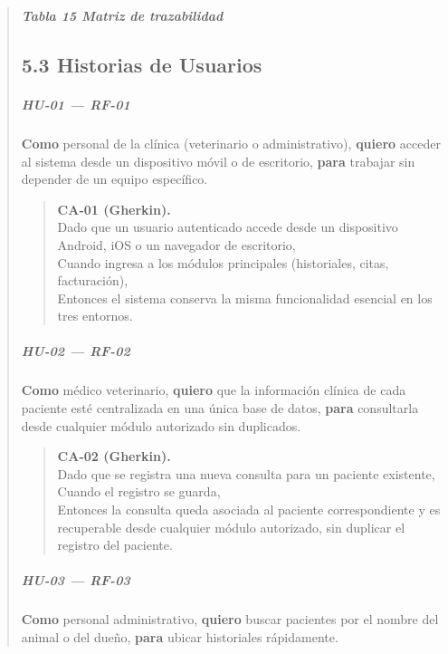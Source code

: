 \documentclass[
]{article}
\begin{document}
\begin{quote}
\protect{}\label{_bookmark66}{}\emph{\textbf{Tabla 15
Matriz de trazabilidad}}

\subsection{5.3 Historias de Usuarios} \label{historias-de-usuario}
\subparagraph{HU-01 --- RF-01}
\textbf{Como} personal de la clínica (veterinario o administrativo),
\textbf{quiero} acceder al sistema desde un dispositivo móvil o de escritorio,
\textbf{para} trabajar sin depender de un equipo específico.

\begin{quote}
\textbf{CA-01 (Gherkin).} \\
Dado que un usuario autenticado accede desde un dispositivo Android, iOS o un navegador de escritorio, \\
Cuando ingresa a los módulos principales (historiales, citas, facturación), \\
Entonces el sistema conserva la misma funcionalidad esencial en los tres entornos.
\end{quote}

\subparagraph{HU-02 --- RF-02}
\textbf{Como} médico veterinario,
\textbf{quiero} que la información clínica de cada paciente esté centralizada en una única base de datos,
\textbf{para} consultarla desde cualquier módulo autorizado sin duplicados.

\begin{quote}
\textbf{CA-02 (Gherkin).} \\
Dado que se registra una nueva consulta para un paciente existente, \\
Cuando el registro se guarda, \\
Entonces la consulta queda asociada al paciente correspondiente y es recuperable desde cualquier módulo autorizado, sin duplicar el registro del paciente.
\end{quote}

\subparagraph{HU-03 --- RF-03}
\textbf{Como} personal administrativo,
\textbf{quiero} buscar pacientes por el nombre del animal o del dueño,
\textbf{para} ubicar historiales rápidamente.


\end{quote}
\end{document}
